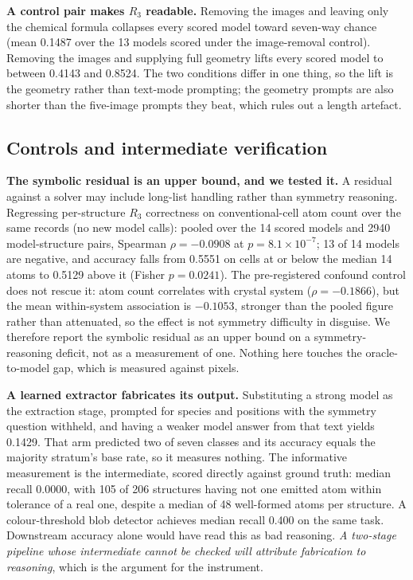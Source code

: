 \textbf{A control pair makes $R_3$ readable.} Removing the images and leaving only the chemical formula
collapses every scored model toward seven-way chance (mean 0.1487 over the 13 models scored under the
image-removal control). Removing the images and supplying full geometry lifts every scored model to
between 0.4143 and 0.8524.
The two conditions differ in one thing, so the lift is the geometry rather than text-mode prompting; the
geometry prompts are also shorter than the five-image prompts they beat, which rules out a length artefact.

\subsection{Controls and intermediate verification}
\label{sec:controls}

\textbf{The symbolic residual is an upper bound, and we tested it.} A residual against a solver may include
long-list handling rather than symmetry reasoning. Regressing per-structure $R_3$ correctness on
conventional-cell atom count over the same records (no new model calls): pooled over the 14 scored models
and 2940 model-structure pairs, Spearman $\rho = -0.0908$ at $p = 8.1\times10^{-7}$; 13 of 14 models are
negative, and accuracy falls from 0.5551 on cells at or below the median 14 atoms to 0.5129 above it
(Fisher $p = 0.0241$). The pre-registered confound control does not rescue it: atom count correlates with
crystal system ($\rho = -0.1866$), but the mean within-system association is $-0.1053$, stronger than the
pooled figure rather than attenuated, so the effect is not symmetry difficulty in disguise. We therefore
report the symbolic residual as an upper bound on a symmetry-reasoning deficit, not as a measurement of
one. Nothing here touches the oracle-to-model gap, which is measured against pixels.

\textbf{A learned extractor fabricates its output.} Substituting a strong model as the extraction stage,
prompted for species and positions with the symmetry question withheld, and having a weaker model answer
from that text yields 0.1429. That arm predicted two of seven classes and its accuracy equals the majority
stratum's base rate, so it measures nothing. The informative measurement is the intermediate, scored
directly against ground truth: median recall 0.0000, with 105 of 206 structures having not one emitted atom
within tolerance of a real one, despite a median of 48 well-formed atoms per structure. A colour-threshold
blob detector achieves median recall 0.400 on the same task. Downstream accuracy alone would have read this
as bad reasoning. \emph{A two-stage pipeline whose intermediate cannot be checked will attribute
fabrication to reasoning}, which is the argument for the instrument.

